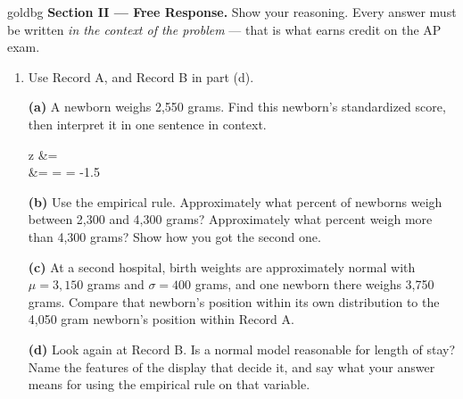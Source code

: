 \vspace{0.14in}

\boxguard[28]
\begin{headlinebox}{goldbg}
\small
\textbf{Section II --- Free Response.} Show your reasoning. Every answer must be written
\emph{in the context of the problem} --- that is what earns credit on the AP exam.
\end{headlinebox}

\vspace{0.10in}

\begin{enumerate}[leftmargin=1.9em, itemsep=0.16in, resume]

  \item Use Record A, and Record B in part (d).

        \boxguard[17]
        \vspace{6pt}
        \textbf{(a)} A newborn weighs 2,550 grams. Find this newborn's standardized score, then
        interpret it in one sentence in context.
        \begin{work}
        z &=  \\[3pt]
          &=  =  = -1.5
        \end{work}

        \boxguard[17]
        \vspace{6pt}
        \textbf{(b)} Use the empirical rule. Approximately what percent of newborns weigh between
        2,300 and 4,300 grams? Approximately what percent weigh more than 4,300 grams? Show how
        you got the second one.\\[4pt]

        \boxguard[17]
        \vspace{6pt}
        \textbf{(c)} At a second hospital, birth weights are approximately normal with
        $\mu = 3{,}150$ grams and $\sigma = 400$ grams, and one newborn there weighs 3,750 grams.
        Compare that newborn's position within its own distribution to the 4,050 gram newborn's
        position within Record A.\\[4pt]

        \boxguard[17]
        \vspace{6pt}
        \textbf{(d)} Look again at Record B. Is a normal model reasonable for length of stay?
        Name the features of the display that decide it, and say what your answer means for using
        the empirical rule on that variable.\\[4pt]

\end{enumerate}

